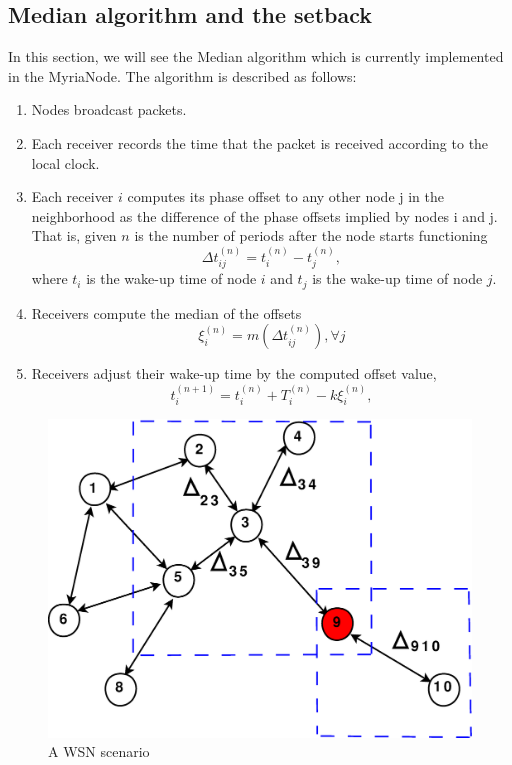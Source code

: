 \documentclass[a4paper,10pt]{report}
\begin{document}
\subsection{\textbf{Median algorithm and the setback}}
In this section, we will see the Median algorithm which is currently
implemented in the MyriaNode. The algorithm is described as follows:
\begin{enumerate}
\item Nodes broadcast packets.
\item Each receiver records the time that the packet is received according to the local clock.
\item Each receiver $i$ computes its phase offset to
any other node j in the neighborhood as the difference of the phase
offsets implied by nodes i and j. That is, given $n$ is the number
of periods after the node starts functioning
\begin{equation}
\Delta t_{ij}^{(n)} = t_i^{(n)} - t_j^{(n)} ,
\end{equation}
where $t_i$ is the wake-up time of node $i$ and $t_j$ is the wake-up
time of node $j$.
\item Receivers compute the median of the offsets
\begin{equation}
\xi_i^{(n)} = m(\Delta t_{ij}^{(n)}) , \forall j
\end{equation}
\item Receivers adjust their wake-up time by the computed offset
value,
\begin{equation}
t_{i}^{(n+1)} = t_i^{(n)} + T_i^{(n)} - k\xi_i^{(n)},
\end{equation}
\end{enumerate}
\begin{figure}
\centering
\includegraphics[width=0.75 \textwidth]{node_field}
\caption{A WSN scenario} \label{wsn}
\end{figure}
\end{document}
